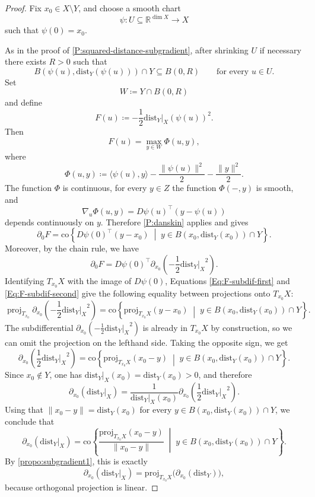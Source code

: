 \documentclass[10pt,a4paper]{amsart}
\newcommand{\R}{\mathbb{R}}
\newcommand{\dd}{\mathrm{dist}}
\newcommand{\dist}{{\mathrm{dist}_Y|_X}}
\begin{document}
\begin{proof}
Fix $x_0 \in X \setminus Y$, and choose a smooth chart
\[
\psi \colon U \subseteq \R^{\dim X} \to X
\]
such that $\psi(0)=x_0$.

As in the proof of \cref{P:squared-distance-subgradient}, after shrinking $U$ if necessary there exists $R>0$ such that
\[
B(\psi(u),\dd_Y(\psi(u))) \cap Y \subseteq B(0,R)
\qquad \text{for every } u \in U.
\]
Set
\[
W \coloneqq Y \cap B(0,R)
\]
and define
\[
F(u)\coloneqq -\frac{1}{2}\dd_Y|_X(\psi(u))^2.
\]
Then
\[
F(u)=\max_{y \in W}\Phi(u,y),
\]
where
\[
\Phi(u,y)\coloneqq
\langle \psi(u),y\rangle-\frac{\|\psi(u)\|^2}{2}-\frac{\|y\|^2}{2}.
\]
The function $\Phi$ is continuous, for every $y \in Z$ the function $\Phi(-,y)$ is smooth, and
\[
\nabla_u\Phi(u,y)=D\psi(u)^{\top}(y-\psi(u))
\]
depends continuously on $y$. Therefore \cref{P:danskin} applies and gives
\[
\label{Eq:F-subdif-first}
\partial_0F
=
\mathrm{co}\left\{
D\psi(0)^{\top}(y-x_0)
\;\middle|\;
y \in B(x_0,\dd_Y(x_0)) \cap Y
\right\}.
\]
Moreover, by the chain rule, we have
\[
\label{Eq:F-subdif-second}
\partial_0 F = D \psi(0)^\top \partial_{x_0} \left( -\frac{1}{2} \dist^2 \right).
\]
Identifying $T_{x_0} X$ with the image of $D \psi(0)$, Equations \eqref{Eq:F-subdif-first} and \eqref{Eq:F-subdif-second} give the following equality between projections onto $T_{x_0} X$:
\[
\operatorname{proj}_{T_{x_0}} \partial_{x_0} \left( -\frac{1}{2} \dist^2 \right) = \mathrm{co} \left\{
\mathrm{proj}_{T_{x_0}X} (y - x_0)
\;\middle|\;
y \in B(x_0, \dd_Y(x_0)) \cap Y
\right\}.
\]
The subdifferential $\partial_{x_0} \left( -\frac{1}{2} \dist^2 \right)$ is already in $T_{x_0} X$ by construction, so we can omit the projection on the lefthand side. Taking the opposite sign, we get
\[
\partial_{x_0}\left(\frac{1}{2}\dist^2\right)
=
\mathrm{co}\left\{
\mathrm{proj}_{T_{x_0}X}(x_0-y)
\;\middle|\;
y \in B(x_0,\dd_Y(x_0)) \cap Y
\right\}.
\]
Since $x_0 \notin Y$, one has $\dist(x_0)=\dd_Y(x_0)>0$, and therefore
\[
\partial_{x_0}(\dist)
=
\frac{1}{\dist(x_0)}
\partial_{x_0}\left(\frac{1}{2}\dist^2\right).
\]
Using that $\|x_0-y\|=\dd_Y(x_0)$ for every $y \in B(x_0,\dd_Y(x_0)) \cap Y$, we conclude that
\[
\partial_{x_0}(\dist)
=
\mathrm{co}\left\{
\frac{\mathrm{proj}_{T_{x_0}X}(x_0-y)}{\|x_0-y\|}
\;\middle|\;
y \in B(x_0,\dd_Y(x_0)) \cap Y
\right\}.
\]
By \cref{propo:subgradient1}, this is exactly
\[
\partial_{x_0}(\dist)=\mathrm{proj}_{T_{x_0}X}\bigl(\partial_{x_0}(\dd_Y)\bigr),
\]
because orthogonal projection is linear.
\end{proof}
\end{document}
